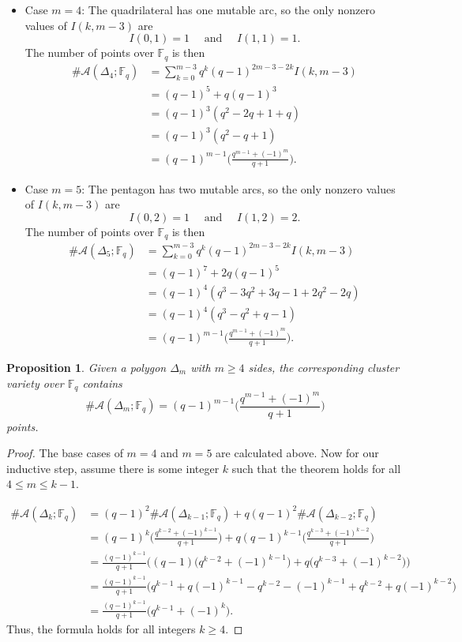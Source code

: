 \documentclass[reqno,12pt]{amsart}
\newtheorem{prop}[thm]{Proposition}
\theoremstyle{definition}
\theoremstyle{remark}
\theoremstyle{remark}
\numberwithin{equation}{section}
\begin{document}
\begin{itemize}
\item Case $m=4$: The quadrilateral has one mutable arc, so the only nonzero values of $I(k,m-3)$ are \[ I(0,1) = 1 \quad \text{ and } \quad I(1,1) = 1. \] The number of points over $\mathbb{F}_q$ is then 
\begin{align*}
	\#\mathcal{A}(\Delta_4 ;\mathbb{F}_q) &= \sum_{k=0}^{m-3} q^k (q-1)^{2m-3-2k} I(k,m-3) \\
	&= (q-1)^5 + q(q-1)^3 \\
	&= (q-1)^3 (q^2 -2q +1 + q) \\
	&= (q-1)^3 (q^2 -q +1) \\
	&= (q-1)^{m-1} \Bigg( \frac{q^{m-1} + (-1)^m}{q+1} \Bigg).
\end{align*}

\item Case $m=5$: The pentagon has two mutable arcs, so the only nonzero values of $I(k,m-3)$ are \[ I(0,2) = 1 \quad \text{ and } \quad I(1,2) = 2. \] The number of points over $\mathbb{F}_q$ is then 
\begin{align*}
	\#\mathcal{A}(\Delta_5 ;\mathbb{F}_q) &= \sum_{k=0}^{m-3} q^k (q-1)^{2m-3-2k} I(k,m-3) \\
	&= (q-1)^{7} + 2q(q-1)^5 \\
	&= (q-1)^4 (q^3 -3q^2 +3q -1 + 2q^2 -2q) \\
	&= (q-1)^4 (q^3 -q^2 +q -1) \\
	&= (q-1)^{m-1} \Bigg( \frac{q^{m-1} + (-1)^m}{q+1} \Bigg).
\end{align*}
\end{itemize}

\begin{prop}\label{prop:polygon points}
	Given a polygon $\Delta_m$ with $m\geq 4$ sides, the corresponding cluster variety over $\mathbb{F}_q$ contains \[ \#\mathcal{A}(\Delta_m; \mathbb{F}_q) = (q-1)^{m-1} \Bigg( \frac{q^{m-1} + (-1)^{m}}{q+1} \Bigg) \] 
	points.
\end{prop}
\begin{proof}
	The base cases of $m=4$ and $m=5$ are calculated above. Now for our inductive step, assume there is some integer $k$ such that the theorem holds for all $4 \leq m \leq k-1$. 
	
	\begin{align*}
		\#\mathcal{A}(\Delta_k ; \mathbb{F}_q) &= (q-1)^2 \#\mathcal{A}(\Delta_{k-1} ; \mathbb{F}_q) + q(q-1)^2 \#\mathcal{A}(\Delta_{k-2} ; \mathbb{F}_q) \\
		&= (q-1)^{k} \Bigg( \frac{q^{k-2} + (-1)^{k-1}}{q+1} \Bigg) + q(q-1)^{k-1} \Bigg( \frac{q^{k-3} + (-1)^{k-2}}{q+1} \Bigg) \\
		&= \frac{(q-1)^{k-1}}{q+1} \big( (q-1)\big(q^{k-2} + (-1)^{k-1}\big) + q \big(q^{k-3} + (-1)^{k-2}\big)\big) \\
		&= \frac{(q-1)^{k-1}}{q+1} \big( q^{k-1} + q(-1)^{k-1} - q^{k-2} - (-1)^{k-1} + q^{k-2} + q(-1)^{k-2}\big) \\
		&= \frac{(q-1)^{k-1}}{q+1} \big( q^{k-1} + (-1)^{k} \big).
	\end{align*}
	Thus, the formula holds for all integers $k\geq 4$. 
\end{proof}
\end{document}
